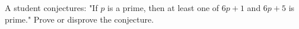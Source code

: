 A student conjectures: "If $p$ is a prime, then at least one of $6p+1$ and $6p+5$ is prime." Prove or disprove the conjecture.
